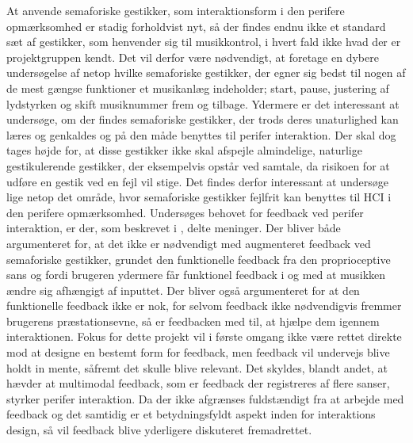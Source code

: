 At anvende semaforiske gestikker, som interaktionsform i den perifere opmærksomhed er stadig forholdvist nyt, så der findes endnu ikke et standard sæt af gestikker, som henvender sig til musikkontrol, i hvert fald ikke hvad der er projektgruppen kendt. Det vil derfor være nødvendigt, at foretage en dybere undersøgelse af netop hvilke semaforiske gestikker, der egner sig bedst til nogen af de mest gængse funktioner et musikanlæg indeholder; start, pause, justering af lydstyrken og skift musiknummer frem og tilbage. Ydermere er det interessant at undersøge, om der findes semaforiske gestikker, der trods deres unaturlighed kan læres og genkaldes og på den måde benyttes til perifer interaktion. Der skal dog tages højde for, at disse gestikker ikke skal afspejle almindelige, naturlige gestikulerende gestikker, der eksempelvis opstår ved samtale, da risikoen for at udføre en gestik ved en fejl vil stige. Det findes derfor interessant at undersøge lige netop det område, hvor semaforiske gestikker fejlfrit kan benyttes til HCI i den perifere opmærksomhed. \blankline
%
Undersøges behovet for feedback ved perifer interaktion, er der, som beskrevet i , delte meninger. Der bliver både argumenteret for, at det ikke er nødvendigt med augmenteret feedback ved semaforiske gestikker, grundet den funktionelle feedback fra den proprioceptive sans og fordi brugeren ydermere får funktionel feedback i og med at musikken ændre sig afhængigt af inputtet. Der bliver også argumenteret for at den funktionelle feedback ikke er nok, for selvom feedback ikke nødvendigvis fremmer brugerens præstationsevne, så er feedbacken med til, at hjælpe dem igennem interaktionen. Fokus for dette projekt vil i første omgang ikke være rettet direkte mod at designe en bestemt form for feedback, men feedback vil undervejs blive holdt in mente, såfremt det skulle blive relevant. Det skyldes, blandt andet, at \textcite[s. 21]{PDF:FacilitatingPIDesignAndEvaluation} hævder at multimodal feedback, som er feedback der registreres af flere sanser, styrker perifer interaktion. Da der ikke afgrænses fuldstændigt fra at arbejde med feedback og det samtidig er et betydningsfyldt aspekt inden for interaktions design, så vil feedback blive yderligere diskuteret fremadrettet.  

